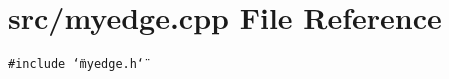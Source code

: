 \section{src/myedge.cpp File Reference}
\label{myedge_8cpp}
{\tt \#include \char`\"{}myedge.h\char`\"{}}\par
